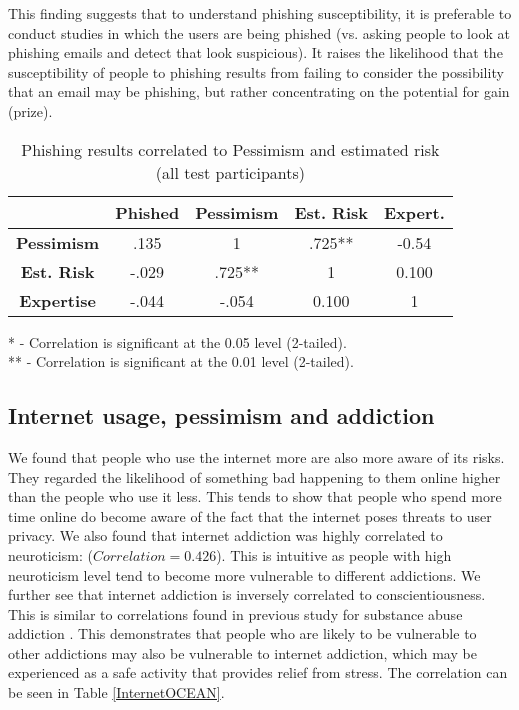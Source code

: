 \documentclass{sig-alternate}
\begin{document}
This finding suggests that to understand phishing susceptibility, it is preferable to conduct studies in which the users are being phished (vs. asking people to look at phishing emails and detect that look suspicious). It raises the likelihood that the susceptibility of people to phishing results from failing to consider the possibility that an email may be phishing, but rather concentrating on the potential for gain (prize). 

\begin{table}[htbp]
\begin{center}
\begin{tabular}{|c|c|c|c|c|}
\hline
&  \textbf{Phished} & \textbf{Pessimism}  &  \textbf{Est. Risk} & \textbf{Expert.}\\
\hline
\hline
\textbf{Pessimism}  & .135	& 1	& .725** & -0.54\\
\hline
\textbf{Est. Risk} & -.029 &	.725**	 &1 & 0.100\\
\hline
\textbf{Expertise} & -.044 &	-.054	 &0.100 & 1\\
\hline

\end{tabular}

\vspace{5mm}
* - Correlation is significant at the 0.05 level (2-tailed).\\
** - Correlation is significant at the 0.01 level (2-tailed).\\

\caption{Phishing results correlated to Pessimism and estimated risk (all test participants)}
\label{Phishedpessimism}
\end{center}
\end{table}





\subsection{Internet usage, pessimism and addiction}
We found that people who use the internet more are also more aware of its risks. They regarded the likelihood of something bad happening to them online higher than the people who use it less. This tends to show that people who spend more time online do become aware of the fact that the internet poses threats to user privacy.
We also found that internet addiction was highly correlated to neuroticism: ($Correlation = 0.426$). 
This is intuitive as people with high neuroticism level tend to become more vulnerable to different addictions. 
We further see that internet addiction is inversely correlated to conscientiousness. This is similar to correlations found in previous study for substance abuse addiction \cite{KN07}.
This demonstrates that people who are likely to be vulnerable to other addictions may also be vulnerable to internet addiction, which may be experienced as a safe activity that provides relief from stress. The correlation can be seen in Table \ref{InternetOCEAN}.
\end{document}
